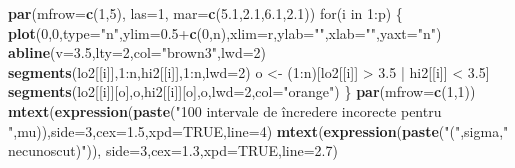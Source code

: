 \documentclass[]{article}
\newenvironment{Shaded}{\begin{snugshade}}{\end{snugshade}}
\newcommand{\KeywordTok}[1]{\textcolor[rgb]{0.13,0.29,0.53}{\textbf{{#1}}}}
\newcommand{\DataTypeTok}[1]{\textcolor[rgb]{0.13,0.29,0.53}{{#1}}}
\newcommand{\DecValTok}[1]{\textcolor[rgb]{0.00,0.00,0.81}{{#1}}}
\newcommand{\FloatTok}[1]{\textcolor[rgb]{0.00,0.00,0.81}{{#1}}}
\newcommand{\StringTok}[1]{\textcolor[rgb]{0.31,0.60,0.02}{{#1}}}
\newcommand{\OtherTok}[1]{\textcolor[rgb]{0.56,0.35,0.01}{{#1}}}
\newcommand{\NormalTok}[1]{{#1}}
\begin{document}
\begin{Shaded}
\begin{Highlighting}[]
\KeywordTok{par}\NormalTok{(}\DataTypeTok{mfrow=}\KeywordTok{c}\NormalTok{(}\DecValTok{1}\NormalTok{,}\DecValTok{5}\NormalTok{), }\DataTypeTok{las=}\DecValTok{1}\NormalTok{, }\DataTypeTok{mar=}\KeywordTok{c}\NormalTok{(}\FloatTok{5.1}\NormalTok{,}\FloatTok{2.1}\NormalTok{,}\FloatTok{6.1}\NormalTok{,}\FloatTok{2.1}\NormalTok{))}
\NormalTok{for(i in }\DecValTok{1}\NormalTok{:p) \{}
  \KeywordTok{plot}\NormalTok{(}\DecValTok{0}\NormalTok{,}\DecValTok{0}\NormalTok{,}\DataTypeTok{type=}\StringTok{"n"}\NormalTok{,}\DataTypeTok{ylim=}\FloatTok{0.5}\NormalTok{+}\KeywordTok{c}\NormalTok{(}\DecValTok{0}\NormalTok{,n),}\DataTypeTok{xlim=}\NormalTok{r,}\DataTypeTok{ylab=}\StringTok{""}\NormalTok{,}\DataTypeTok{xlab=}\StringTok{""}\NormalTok{,}\DataTypeTok{yaxt=}\StringTok{"n"}\NormalTok{)}
  \KeywordTok{abline}\NormalTok{(}\DataTypeTok{v=}\FloatTok{3.5}\NormalTok{,}\DataTypeTok{lty=}\DecValTok{2}\NormalTok{,}\DataTypeTok{col=}\StringTok{"brown3"}\NormalTok{,}\DataTypeTok{lwd=}\DecValTok{2}\NormalTok{)}
  \KeywordTok{segments}\NormalTok{(lo2[[i]],}\DecValTok{1}\NormalTok{:n,hi2[[i]],}\DecValTok{1}\NormalTok{:n,}\DataTypeTok{lwd=}\DecValTok{2}\NormalTok{)}
  \NormalTok{o <-}\StringTok{ }\NormalTok{(}\DecValTok{1}\NormalTok{:n)[lo2[[i]] >}\StringTok{ }\FloatTok{3.5} \NormalTok{|}\StringTok{ }\NormalTok{hi2[[i]] <}\StringTok{ }\FloatTok{3.5}\NormalTok{]}
  \KeywordTok{segments}\NormalTok{(lo2[[i]][o],o,hi2[[i]][o],o,}\DataTypeTok{lwd=}\DecValTok{2}\NormalTok{,}\DataTypeTok{col=}\StringTok{"orange"}\NormalTok{)}
\NormalTok{\}}
\KeywordTok{par}\NormalTok{(}\DataTypeTok{mfrow=}\KeywordTok{c}\NormalTok{(}\DecValTok{1}\NormalTok{,}\DecValTok{1}\NormalTok{))}
\KeywordTok{mtext}\NormalTok{(}\KeywordTok{expression}\NormalTok{(}\KeywordTok{paste}\NormalTok{(}\StringTok{"100 intervale de încredere incorecte pentru "}\NormalTok{,mu)),}\DataTypeTok{side=}\DecValTok{3}\NormalTok{,}\DataTypeTok{cex=}\FloatTok{1.5}\NormalTok{,}\DataTypeTok{xpd=}\OtherTok{TRUE}\NormalTok{,}\DataTypeTok{line=}\DecValTok{4}\NormalTok{)}
\KeywordTok{mtext}\NormalTok{(}\KeywordTok{expression}\NormalTok{(}\KeywordTok{paste}\NormalTok{(}\StringTok{"("}\NormalTok{,sigma,}\StringTok{" necunoscut)"}\NormalTok{)),}
      \DataTypeTok{side=}\DecValTok{3}\NormalTok{,}\DataTypeTok{cex=}\FloatTok{1.3}\NormalTok{,}\DataTypeTok{xpd=}\OtherTok{TRUE}\NormalTok{,}\DataTypeTok{line=}\FloatTok{2.7}\NormalTok{)}
\end{Highlighting}
\end{Shaded}
\end{document}
